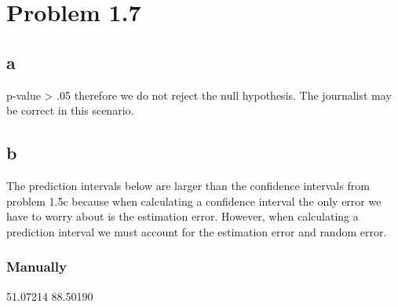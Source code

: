\documentclass{article}
\begin{document}
\section*{Problem 1.7}
\subsection*{a}
\begin{Schunk}
\end{Schunk}
p-value > .05 therefore we do not reject the null hypothesis. The journalist may be correct in this scenario.

\subsection*{b}
The prediction intervals below are larger than the confidence intervals from problem 1.5c because when calculating a confidence interval the only error we have to worry about is the estimation error. However, when calculating a prediction interval we must account for the estimation error and random error. 

\subsubsection*{Manually}
\begin{Schunk}
\begin{Soutput}
[1] 51.07214 88.50190
\end{Soutput}
\end{Schunk}
\end{document}
